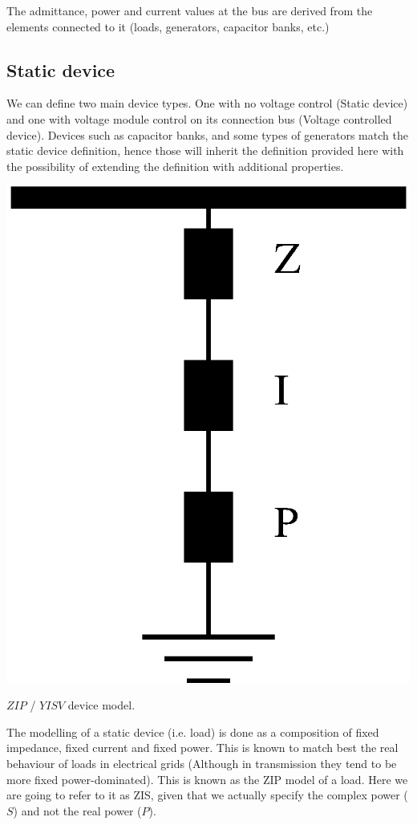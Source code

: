 \documentclass[nols,a4paper,twoside,notoc,fleqn]{tufte-book}
\begin{document}
The admittance, power and current values at the bus are derived from the elements connected to it (loads, generators, capacitor banks, etc.)


\subsection{Static device}

We can define two main device types. One with no voltage control (Static device) and one with voltage module control on its connection bus (Voltage controlled device). Devices such as capacitor banks, and some types of generators match the static device definition, hence those will inherit the definition provided here with the possibility of extending the definition with additional properties.

\begin{marginfigure}
	\includegraphics[width=0.99\linewidth]{img/ZIP_model.eps}
	\caption{$ZIP$ / $YISV$ device model.}
	\label{zip_model}
\end{marginfigure}

The modelling of a static device (i.e. load) is done as a composition of fixed impedance, fixed current and fixed power. This is known to match best the real behaviour of loads in electrical grids (Although in transmission they tend to be more fixed power-dominated). This is known as the ZIP model of a load. Here we are going to refer to it as ZIS, given that we actually specify the complex power ($S$) and not the real power ($P$).
\end{document}
